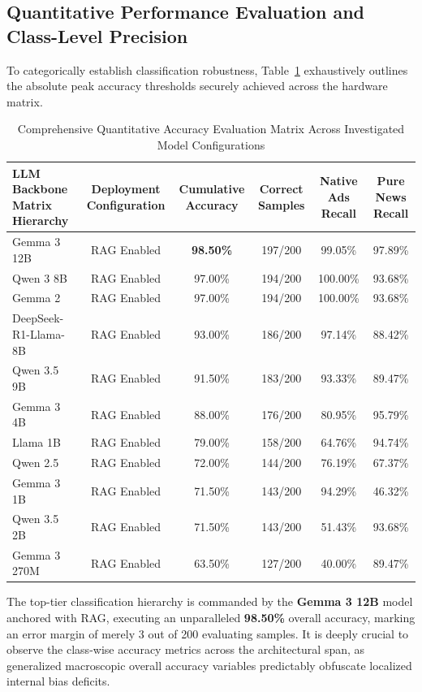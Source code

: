\documentclass{ieeeaccess}
\begin{document}
\subsection{Quantitative Performance Evaluation and Class-Level Precision}
To categorically establish classification robustness, Table~\ref{tab:best_per_model_eval_results} exhaustively outlines the absolute peak accuracy thresholds securely achieved across the hardware matrix. 

\begin{table}[t]
\caption{Comprehensive Quantitative Accuracy Evaluation Matrix Across Investigated Model Configurations}
\label{tab:best_per_model_eval_results}
\begin{center}
\renewcommand{\arraystretch}{1.3}
\begin{tabular}{|l|c|c|c|c|c|}
\hline
\textbf{LLM Backbone Matrix Hierarchy} & \textbf{Deployment Configuration} & \textbf{Cumulative Accuracy} & \textbf{Correct Samples} & \textbf{Native Ads Recall} & \textbf{Pure News Recall} \\
\hline
Gemma 3 12B & RAG Enabled & \textbf{98.50\%} & 197/200 & 99.05\% & 97.89\% \\
Qwen 3 8B & RAG Enabled & 97.00\% & 194/200 & 100.00\% & 93.68\% \\
Gemma 2 & RAG Enabled & 97.00\% & 194/200 & 100.00\% & 93.68\% \\
DeepSeek-R1-Llama-8B & RAG Enabled & 93.00\% & 186/200 & 97.14\% & 88.42\% \\
Qwen 3.5 9B & RAG Enabled & 91.50\% & 183/200 & 93.33\% & 89.47\% \\
Gemma 3 4B & RAG Enabled & 88.00\% & 176/200 & 80.95\% & 95.79\% \\
Llama 1B & RAG Enabled & 79.00\% & 158/200 & 64.76\% & 94.74\% \\
Qwen 2.5 & RAG Enabled & 72.00\% & 144/200 & 76.19\% & 67.37\% \\
Gemma 3 1B & RAG Enabled & 71.50\% & 143/200 & 94.29\% & 46.32\% \\
Qwen 3.5 2B & RAG Enabled & 71.50\% & 143/200 & 51.43\% & 93.68\% \\
Gemma 3 270M & RAG Enabled & 63.50\% & 127/200 & 40.00\% & 89.47\% \\
\hline
\end{tabular}
\end{center}
\end{table}

The top-tier classification hierarchy is commanded by the \textbf{Gemma 3 12B} model anchored with RAG, executing an unparalleled \textbf{98.50\%} overall accuracy, marking an error margin of merely 3 out of 200 evaluating samples. It is deeply crucial to observe the class-wise accuracy metrics across the architectural span, as generalized macroscopic overall accuracy variables predictably obfuscate localized internal bias deficits. 
\end{document}
